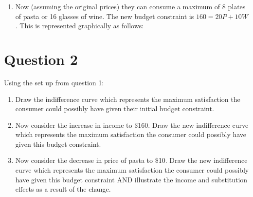 \documentclass[12pt]{article}
\begin{document}
\begin{enumerate}
\item Now (assuming the original prices) they can consume a maximum of 8 plates of pasta or 16 glasses of wine. The new budget constraint is \(160 = 20P + 10W\). This is represented graphically as follows:


\end{enumerate}

\newpage
\section*{Question 2}
Using the set up from question 1:
\begin{enumerate}
    \item Draw the indifference curve which represents the maximum satisfaction the consumer could possibly have given their initial budget constraint.
    \item Now consider the increase in income to \$160. Draw the new indifference curve which represents the maximum satisfaction the consumer could possibly have given this budget constraint.
    \item Now consider the decrease in price of pasta to \$10. Draw the new indifference curve which represents the maximum satisfaction the consumer could possibly have given this budget constraint AND illustrate the income and substitution effects as a result of the change. 
\end{enumerate}
\end{document}

